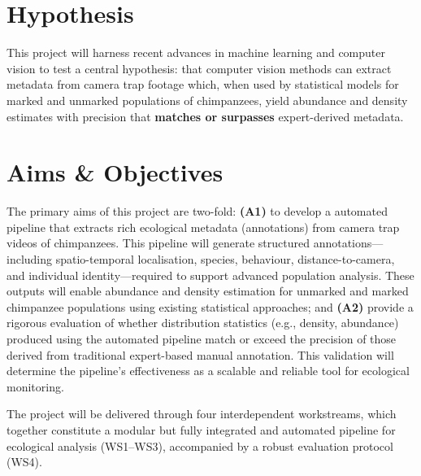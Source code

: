 \section{Hypothesis}

This project will harness recent advances in machine learning and computer vision to test a central hypothesis: that computer vision methods can extract metadata from camera trap footage which, when used by statistical models for marked and unmarked populations of chimpanzees, yield abundance and density estimates with precision that \textbf{matches or surpasses} expert-derived metadata.

\section{Aims \& Objectives}

The primary aims of this project are two-fold: \textbf{(A1)} to develop a automated pipeline that extracts rich ecological metadata (annotations) from camera trap videos of chimpanzees. This pipeline will generate structured annotations—including spatio-temporal localisation, species, behaviour, distance-to-camera, and individual identity—required to support advanced population analysis. These outputs will enable abundance and density estimation for unmarked and marked chimpanzee populations using existing statistical approaches; and \textbf{(A2)} provide a rigorous evaluation of whether distribution statistics (e.g., density, abundance) produced using the automated pipeline match or exceed the precision of those derived from traditional expert-based manual annotation. This validation will determine the pipeline’s effectiveness as a scalable and reliable tool for ecological monitoring.

The project will be delivered through four interdependent workstreams, which together constitute a modular but fully integrated and automated pipeline for ecological analysis (WS1–WS3), accompanied by a robust evaluation protocol (WS4).

